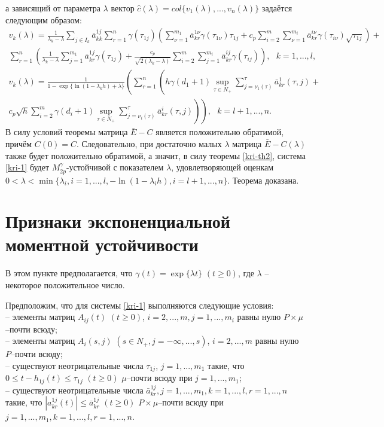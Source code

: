 а зависящий от параметра $\lambda$ вектор $\hat c(\lambda) = col
\{v_1 (\lambda), ..., v_n (\lambda )\}$
 задаётся следующим образом:
$$
\begin{array}{crl}
v_ k(\lambda ) = \frac{1}{\lambda _k - \lambda}\sum \limits_{j \in
I_k}\bar a^{1j}_{kk}\sum \limits_{r=1}^n\gamma (\tau
_{1j})\left(\sum \limits_{\nu=1}^{m_1}\bar a^{1\nu}_{kr} \gamma
(\tau _{1\nu})\tau _{1j} + c_p\sum \limits_{i=2}^m \sum
\limits_{\nu=1}^{m_i}\bar a^{i\nu}_{kr}\gamma (\tau
_{i\nu})\sqrt{\tau _{1j}}\right ) +\\
\sum \limits_{r=1}^{n}\left(\frac{1}{\lambda _k - \lambda}\sum
\limits_{j=1}^{m_1}\bar a^{1j}_{kr}\gamma (\tau_{1j}) +
\frac{c_p}{\sqrt{2(\lambda_k -\lambda)}}\sum \limits_{i=2}^m \sum
\limits_{j=1}^{m_i}\bar a^{ij}_{kr}\gamma (\tau _{ij})\right ), \ \
\ k  = 1,...,l,\\
v_ k(\lambda ) = \frac{1}{1-\exp\{\ln(1-\lambda_kh)+\lambda\}}
\left(\sum \limits _{r=1 }^n\left( h\gamma (d_1 +1)\mathrel {\mathop
{\sup} \limits _{\tau \in N_+}}\sum \limits _{j=\nu
_1 (\tau)}^{\tau}\bar a^{1}_{kr}(\tau,j) +\right. \right .\\
\left .\left .c_p\sqrt{h}\sum \limits _{i=2}^{m}\gamma (d_i
+1)\mathrel {\mathop {\sup} \limits _{\tau \in N_+}}\sum \limits
_{j=\nu _i (\tau)}^{\tau}\bar a^{i}_{kr}(\tau,j) \right )\right ),\
\ \ k = l+1, ...,n.
\end {array}
$$
В силу условий теоремы матрица $\bar E - C$ является положительно
обратимой, причём $C(0) = C$. Следовательно, при достаточно малых
$\lambda $ матрица $\bar E- C(\lambda )$ также будет положительно
обратимой, а значит, в силу теоремы \ref{kri-th2}, система \eqref{kri-1} будет
$M_{2p}^\gamma$-устойчивой с показателем $\lambda$, удовлетворяющей
оценкам $0<\lambda < \min \{\lambda _i, i = 1, ...,l, -\ln
(1-\lambda _ih), i = l+1, ..., n \}$. Теорема доказана.

\section{Признаки экспоненциальной моментной устойчивости}\label{kri-s4}
В этом пункте предполагается, что $\gamma (t) = \exp \{\lambda t\}
\,\, (t \geq 0)$, где $\lambda$ --  некоторое  положительное число.

Предположим, что для системы \eqref{kri-1} выполняются следующие условия:\\
\noindent
  -- элементы матриц
$A_{ij}(t) \,\, (t \geq 0)$, $i = 2,...,m, j = 1,...,m_i$ равны нулю
$P\times \mu$--почти всюду;\\
  -- элементы матриц $A_i(s,j)\,\, (s \in
N_+, j=-\infty,...,s)$, $i=2,...,m$  равны нулю $P$--почти всюду;\\
    --  существуют неотрицательные числа $\tau_{1j}$, $j = 1,...,m_1$ такие, что $0 \leq t- h_{1j}(t) \leq \tau _{1j} {\,} {\,} (t
\geq 0)$ $\mu $--почти всюду при $j = 1,...,m_1$;\\
  -- существуют неотрицательные числа $\bar a^{1j}_{kr}, j = 1,...,m_1, k =1,...,l, r = 1,...,n$
 такие, что $|a^{1j}_{kr}(t)|\leq \bar a^{1j}_{kr} \,\, (t\geq 0) $
$P\times\mu$--почти всюду при $j = 1,...,m_1, k =1,...,l, r =
1,...,n$.


